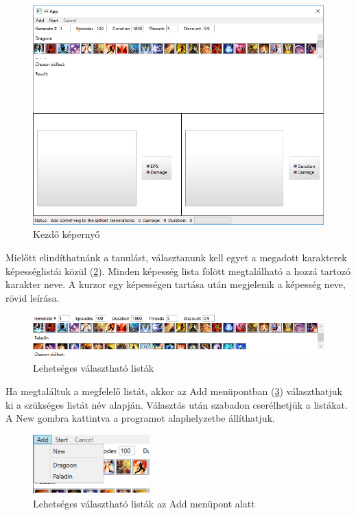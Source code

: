 \documentclass[12pt]{article}
\begin{document}
\begin{figure}[H]
	\begin{center}
		\includegraphics[width=1\textwidth]{start}
	\end{center}
	\caption{Kezdő képernyő}
	\label{fig:start}
\end{figure}

Mielőtt elindíthatnánk a tanulást, választanunk kell egyet a megadott karakterek képességlistái közül (\ref{fig:skilllist}). Minden képesség lista fölött megtalálható a hozzá tartozó karakter neve. A kurzor egy képességen tartása után megjelenik a képesség neve, rövid leírása. 

\begin{figure}[H]
	\begin{center}
		\includegraphics[width=1\textwidth]{skilllist}
	\end{center}
	\caption{Lehetséges választható listák}
	\label{fig:skilllist}
\end{figure}

Ha megtaláltuk a megfelelő listát, akkor az Add menüpontban (\ref{fig:addmenu}) választhatjuk ki a szükséges listát név alapján. Választás után szabadon cserélhetjük a listákat. A New gombra kattintva a programot alaphelyzetbe állíthatjuk.

\begin{figure}[H]
	\begin{center}
		\includegraphics[width=0.4\textwidth]{addmenu}
	\end{center}
	\caption{Lehetséges választható listák az Add menüpont alatt}
	\label{fig:addmenu}
\end{figure}
\end{document}
